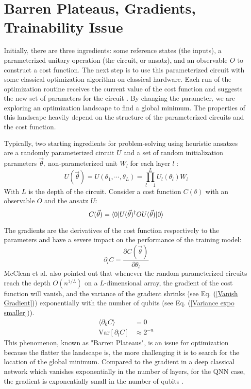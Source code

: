 \section{Barren Plateaus, Gradients, Trainability Issue}
Initially, there are three ingredients: some reference states (the inputs), a parameterized unitary operation (the circuit, or ansatz), and an observable $O$ to construct a cost function.
The next step is to use this parameterized circuit with some classical optimization algorithm on classical hardware.
Each run of the optimization routine receives the current value of the cost function and suggests the new set of parameters for the circuit \cite{cerezo2021variational}.
By changing the parameter, we are exploring an optimization landscape to find a global minimum.
The properties of this landscape heavily depend on the structure of the parameterized circuits and the cost function.

Typically, two starting ingredients for problem-solving using heuristic ansatzes are a randomly parameterized circuit $U$ and a set of random initialization parameters $\vec{\theta}$, non-parameterized unit $W_l$ for each layer $l$ \cite{mccleanBarrenPlateausQuantum2018}:
\begin{equation}\label{Parameterized Circuit}
    U(\vec{\theta})
    = U(\theta_1, \cdots, \theta_L)
    = \prod_{l=1}^L U_l(\theta_l)W_l
\end{equation}
With $L$ is the depth of the circuit. Consider a cost function $C(\theta)$ with an observable $O$ and the ansatz $U$:
\begin{equation}
    C(\vec{\theta})
    = \bra{0} U(\vec{\theta})^\dagger OU(\vec{\theta}) \ket{0}
\end{equation}

The gradients are the derivatives of the cost function respectively to the parameters and have a severe impact on the performance of the training model:
\begin{equation}
    \partial_l C = \frac{\partial C(\vec{\theta})}{\partial\theta_l}
\end{equation}
McClean et al.\cite{mccleanBarrenPlateausQuantum2018} also pointed out that whenever the random parameterized circuits reach the depth $O(n^{1/L})$ on a $L$-dimensional array, the gradient of the cost function will vanish, and the variance of the gradient shrinks (see Eq. (\ref{Vanish Gradient})) exponentially with the number of qubits (see Eq. (\ref{Variance expo smaller})).
\begin{align}
    \langle \partial_k C\rangle &= 0  \label{Vanish Gradient}\\
    \mathrm{Var}[\partial_l C] &\approx 2^{-n}  \label{Variance expo smaller}
\end{align}
This phenomenon, known as "Barren Plateaus", is an issue for optimization because the flatter the landscape is, the more challenging it is to search for the location of the global minimum.
Compared to the gradient in a deep classical network which vanishes exponentially in the number of layers, for the QNN case, the gradient is exponentially small in the number of qubits \cite{mccleanBarrenPlateausQuantum2018}.

